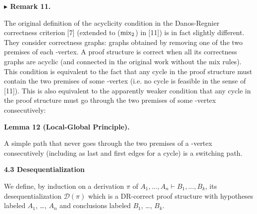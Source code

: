  
 
\par\medskip\noindent\textbf{$\blacktriangleright$ Remark 11.}\par
 
 
The original definition of the acyclicity condition in the Danos-Regnier correctness criterion [7] (extended to ($\textnormal{{mix}}_{2}$) in [11]) is in fact slightly different. They consider correctness graphs: graphs obtained by removing one of the two premises of each -vertex. A proof structure is correct when all its correctness graphs are acyclic (and connected in the original work without the mix rules). This condition is equivalent to the fact that any cycle in the proof structure must contain the two premises of some -vertex (i.e. no cycle is feasible in the sense of [11]). This is also equivalent to the apparently weaker condition that any cycle in the proof structure must go through the two premises of some -vertex consecutively:\par
 
 
 
 
\par\medskip\noindent\textbf{Lemma 12 (Local-Global Principle).}\par
 
 
A simple path that never goes through the two premises of a -vertex consecutively (including as last and first edges for a cycle) is a switching path.\par
 
 
 
 
 
\par\medskip\noindent\textbf{4.3 Desequentialization}\par
 
 
We define, by induction on a derivation $\pi$ of $A_{1},\dotsc,A_{n}\vdash B_{1},\dotsc,B_{k}$, its desequentialization $\mathcal{D}(\pi)$ which is a DR-correct proof structure with hypotheses labeled $A_{1}$, …, $A_{n}$ and conclusions labeled $B_{1}$, …, $B_{k}$.\par
  
